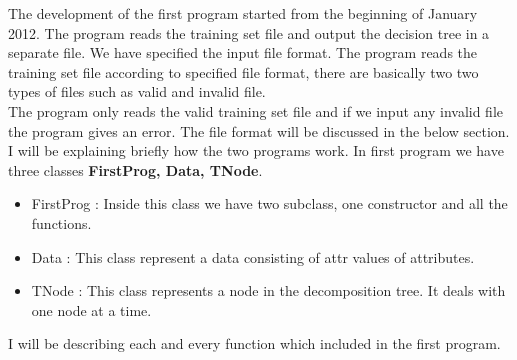 \documentclass{report}
\begin{document}
The development of the first program started from the beginning of January 2012. The program reads the training set file and output the decision tree in a separate file. We have specified the input file format. The program reads the training set file according to specified file format, there are basically two two types of files such as valid and invalid file.\\
The program only reads the valid training set file and if we input any invalid file the program gives an error. The file format will be discussed in the below section.\\

I will be explaining briefly how the two programs work. 
In first program we have three classes {\bf FirstProg, Data, TNode}.

\begin{itemize}

\item FirstProg : Inside this class we have two subclass, one constructor and all the functions.
\item Data : This class represent a data consisting of attr values of attributes.
\item TNode : This class represents a node in the decomposition tree. It deals with one node at a time.
\end{itemize}


I will be describing each and every function which included in the first program. 
 
\end{document}
